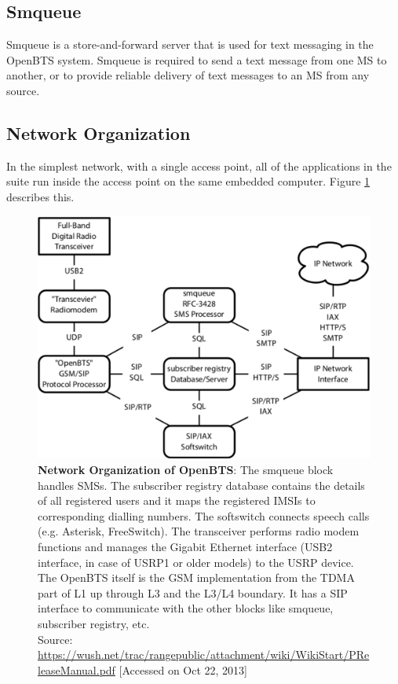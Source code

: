 \subsection{Smqueue}
Smqueue is a store-and-forward server that is used for text messaging in the OpenBTS system. Smqueue is required to send a text message from one MS to another, or to provide reliable delivery of text messages to an MS from any source.

\subsection{Network Organization}
In the simplest network, with a single access point, all of the applications
in the suite run inside the access point on the same embedded computer. Figure
\ref{btsSimple} describes this.



\begin{figure}
\centering
\includegraphics[width=1\textwidth]{btsSimple}
\caption[Network Organization of OpenBTS]{\textbf{Network Organization of OpenBTS}: The smqueue block handles SMSs.
The subscriber registry database contains the details of all registered users and it
maps the registered IMSIs to corresponding dialling numbers. The softswitch connects
speech calls (e.g. Asterisk, FreeSwitch). The transceiver performs radio modem
functions and manages the Gigabit Ethernet interface (USB2 interface, in case
of USRP1 or older models) to the USRP device. The OpenBTS itself is the GSM
implementation from the TDMA part of L1 up through L3 and the L3/L4 boundary.
It has a SIP interface to communicate with the other blocks like smqueue, subscriber
registry, etc. \\
\footnotesize{Source: \url{https://wush.net/trac/rangepublic/attachment/wiki/WikiStart/PReleaseManual.pdf} [Accessed on Oct 22, 2013]}
}
\label{btsSimple}
\end{figure}

